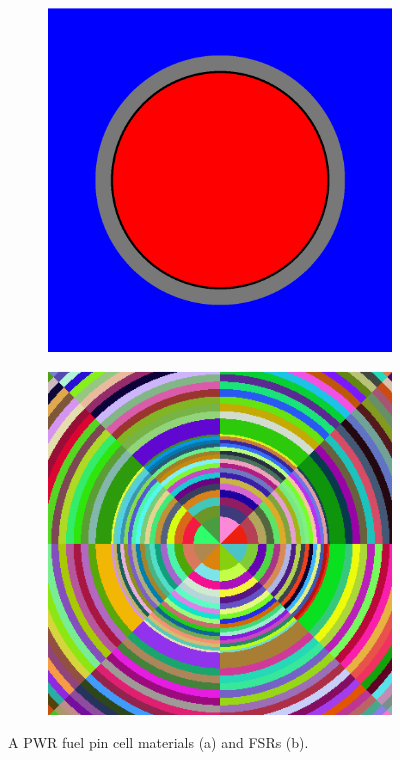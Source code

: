 \begin{figure}[h!]
\centering
\begin{subfigure}{.25\textwidth}
  \includegraphics[width=0.9\linewidth]{figures/pin-cell-simple}
  \caption{}
  \label{fig:pin-materials}
\end{subfigure}%
\begin{subfigure}{.25\textwidth}
  \centering
  \includegraphics[width=0.9\linewidth]{figures/pin-cell-16x8}
  \caption{}
  \label{fig:pin-fsrs}
\end{subfigure}
\caption{A PWR fuel pin cell materials (a) and FSRs (b).}
\label{fig:pin-cell}
\end{figure}


